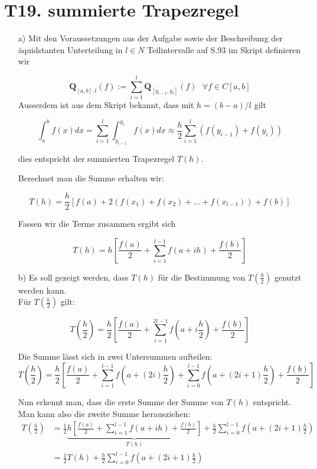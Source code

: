 \documentclass[11pt]{article}
\theoremstyle{plain}
\theoremstyle{definition}
\renewcommand{\a}{\"{a}}
\renewcommand{\u}{\"{u}}
\begin{document}
\section*{T19. summierte Trapezregel}
\begin{itemize}
\item[a)]
Mit den Voraussetzungen aus der Aufgabe sowie der Beschreibung der \a quidstanten Unterteilung in $l\in N$ Teilintervalle
auf S.93 im Skript definieren wir 

\[\mathbf{Q}_{[a,b],l}(f) := \sum_{i=1}^l \mathbf{Q}_{[y_{i-1}, y_i]}(f) \mbox{ } \forall f \in C[a,b] \]
Ausserdem ist aus dem Skript bekannt, dass mit $h = (b-a)/l$ gilt

\[ \int_a^b f(x) dx = \sum_{i=1}^l \int_{y_{i-1}}^{y_i} f(x) dx \approx \frac{h}{2} \sum_{i=1}^l (f(y_{i-1}) + f(y_i)) \]

dies entspricht der summierten Trapezregel $T(h)$.

Berechnet man die Summe erhalten wir:

\[ T(h) = \frac{h}{2} \left[ f(a) + 2 \left( f(x_1) + f(x_2) + \dots + f(x_{l-1}) \right) + f(b) \right] \]

Fassen wir die Terme zusammen ergibt sich

\[ T(h) = h \left[ \frac{f(a)}{2} + \sum_{i=1}^{l-1} f(a+ih) + \frac{f(b)}{2} \right] \]


\item[b)]
Es soll gezeigt werden, dass $T(h)$ f\u r die Bestimmung von $T(\frac{h}{2})$ genutzt werden kann.\\
F\u r $T(\frac{h}{2})$ gilt:

\begin{equation}
T\left(\frac{h}{2}\right) = \frac{h}{2}\left[\frac{f(a)}{2}+\sum_{i=1}^{2l-1} f\left(a+i\frac{h}{2}\right) + \frac{f(b)}{2}\right]
\end{equation}

Die Summe l\a sst sich in zwei Untersummen aufteilen:
\begin{equation}
T\left(\frac{h}{2}\right) = \frac{h}{2}\left[\frac{f(a)}{2}+\sum_{i=1}^{l-1} f\left(a+(2i)\frac{h}{2}\right) +\sum_{i=0}^{l-1} f\left(a+(2i+1)\frac{h}{2}\right) + \frac{f(b)}{2}\right]
\end{equation}

Nun erkennt man, dass die erste Summe der Summe von $T(h)$ entspricht. Man kann also die zweite Summe herausziehen:
\begin{align}
T\left(\frac{h}{2}\right) &= \frac{1}{2}\underbrace{h\left[\frac{f(a)}{2}+\sum_{i=1}^{l-1} f\left(a+ih\right)  + \frac{f(b)}{2}\right]}_{T(h)} + \frac{h}{2}\sum_{i=0}^{l-1} f\left(a+(2i+1)\frac{h}{2}\right) \\
&= \frac{1}{2}T(h) + \frac{h}{2}\sum_{i=0}^{l-1} f\left(a+(2i+1)\frac{h}{2}\right)
\end{align}


\end{itemize}
\end{document}
